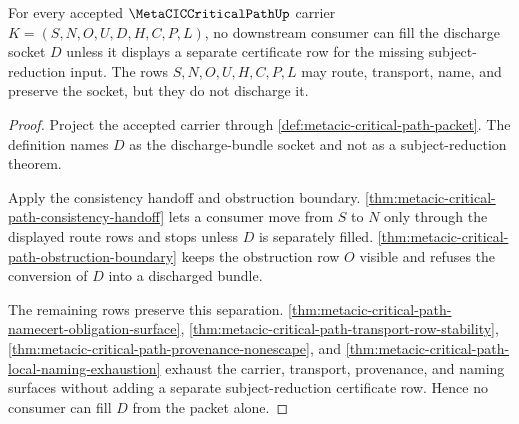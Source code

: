 \begin{theorem}
\label{thm:metacic-critical-path-discharge-socket-nonescape}
For every accepted $\MetaCICCriticalPathUp$ carrier $K=(S,N,O,U,D,H,C,P,L)$, no downstream consumer can fill the discharge socket $D$ unless it displays a separate certificate row for the missing subject-reduction input. The rows $S,N,O,U,H,C,P,L$ may route, transport, name, and preserve the socket, but they do not discharge it.
\end{theorem}
\begin{proof}
Project the accepted carrier through \autoref{def:metacic-critical-path-packet}. The definition names $D$ as the discharge-bundle socket and not as a subject-reduction theorem.

Apply the consistency handoff and obstruction boundary. \autoref{thm:metacic-critical-path-consistency-handoff} lets a consumer move from $S$ to $N$ only through the displayed route rows and stops unless $D$ is separately filled. \autoref{thm:metacic-critical-path-obstruction-boundary} keeps the obstruction row $O$ visible and refuses the conversion of $D$ into a discharged bundle.

The remaining rows preserve this separation. \autoref{thm:metacic-critical-path-namecert-obligation-surface}, \autoref{thm:metacic-critical-path-transport-row-stability}, \autoref{thm:metacic-critical-path-provenance-nonescape}, and \autoref{thm:metacic-critical-path-local-naming-exhaustion} exhaust the carrier, transport, provenance, and naming surfaces without adding a separate subject-reduction certificate row. Hence no consumer can fill $D$ from the packet alone.
\end{proof}

